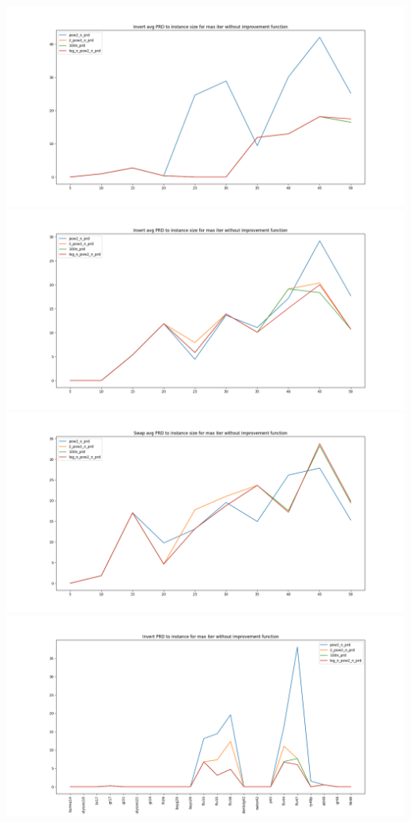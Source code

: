 \documentclass{article}
\begin{document}
\begin{multicols}{2}
    \begin{center}
      \includegraphics[scale=0.2]{rand_impiter_inv_prd.png}
      \includegraphics[scale=0.2]{rand_impiter_ins_prd.png}
      \includegraphics[scale=0.2]{rand_impiter_swp_prd.png}
      \includegraphics[scale=0.2]{impiter_inv_prd.png}

\end{center}
\end{multicols}
\end{document}
